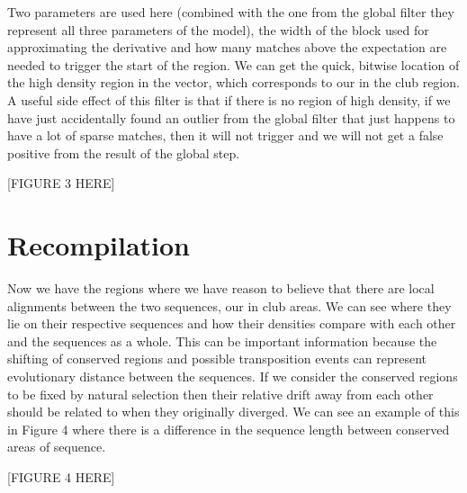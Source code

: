 \documentclass[phd,tocprelim]{cornell}
\renewcommand{\caption}[1]{\singlespacing\hangcaption{#1}\normalspacing}
\begin{document}
Two parameters are used here (combined with the one from the global filter they represent all three parameters of the model), the width of the block used for approximating the derivative and how many matches above the expectation are needed to trigger the start of the region. We can get the quick, bitwise location of the high density region in the vector, which corresponds to our in the club region. A useful side effect of this filter is that if there is no region of high density, if we have just accidentally found an outlier from the global filter that just happens to have a lot of sparse matches, then it will not trigger and we will not get a false positive from the result of the global step.

[FIGURE 3 HERE]


\section{Recompilation}

Now we have the regions where we have reason to believe that there are local alignments between the two sequences, our in club areas. We can see where they lie on their respective sequences and how their densities compare with each other and the sequences as a whole. This can be important information because the shifting of conserved regions and possible transposition events can represent evolutionary distance between the sequences. If we consider the conserved regions to be fixed by natural selection then their relative drift away from each other should be related to when they originally diverged. We can see an example of this in Figure 4 where there is a difference in the sequence length between conserved areas of sequence.

[FIGURE 4 HERE]
\end{document}
